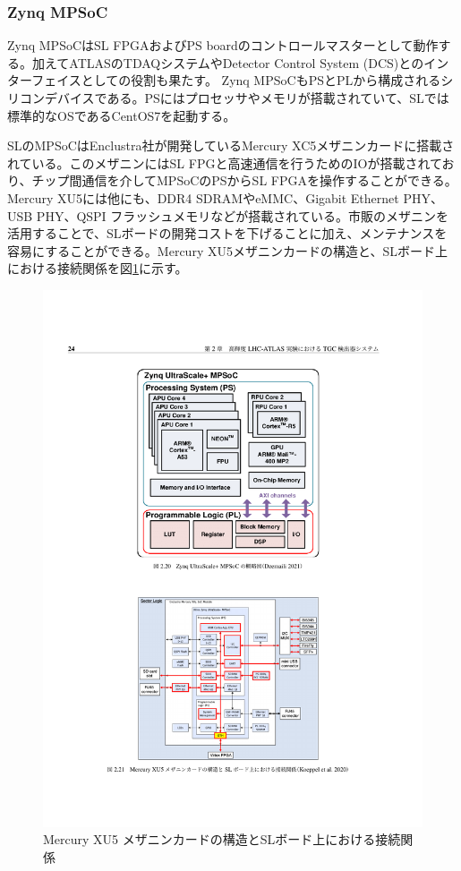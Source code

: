     \subsubsection*{Zynq MPSoC}
Zynq MPSoCはSL FPGAおよびPS boardのコントロールマスターとして動作する。加えてATLASのTDAQシステムやDetector Control System (DCS)とのインターフェイスとしての役割も果たす。
Zynq MPSoCもPSとPLから構成されるシリコンデバイスである。PSにはプロセッサやメモリが搭載されていて、SLでは標準的なOSであるCentOS7を起動する。

SLのMPSoCはEnclustra社が開発しているMercury XC5メザニンカードに搭載されている。このメザニンにはSL FPGと高速通信を行うためのIOが搭載されており、チップ間通信を介してMPSoCのPSからSL FPGAを操作することができる。Mercury XU5には他にも、DDR4 SDRAMやeMMC、Gigabit Ethernet PHY、USB PHY、QSPI フラッシュメモリなどが搭載されている。市販のメザニンを活用することで、SLボードの開発コストを下げることに加え、メンテナンスを容易にすることができる。Mercury XU5メザニンカードの構造と、SLボード上における接続関係を図\ref{SL_mezanin}に示す。

\begin{figure} 
\centering
\includegraphics[width=16cm]{fig/Intro/SL_mezanin.pdf}
\caption[Mercury XU5 メザニンカードの構造とSLボード上における接続関係]{Mercury XU5 メザニンカードの構造とSLボード上における接続関係\cite{mt_mishima}}
\label{SL_mezanin}
\end{figure}